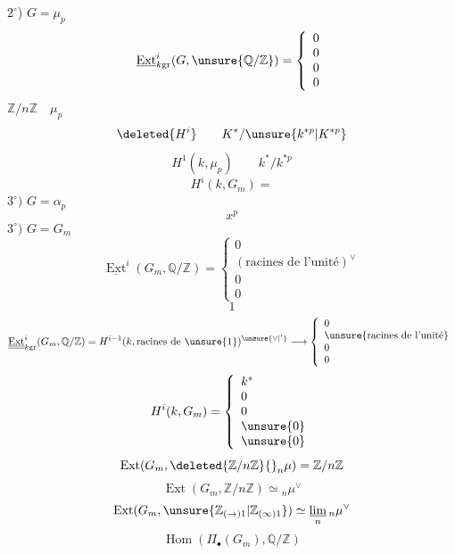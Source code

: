 \uline{$2^\circ$}) $G=\mu_p$
\[
\underline{\operatorname{Ext}}^i_{k\mathrm{gr}}(G,\unsure{\mathbb Q/\mathbb Z})=
\left\{\begin{array}{l}0\\0\\0\\0\end{array}\right.
\]
\qquad $\mathbb Z/n\mathbb Z\quad\mu_p$
\[
\deleted{H^i}\qquad K^*/\unsure{k^{*p}|K^{*p}}
\]
\[
H^1(k,\mu_p)\qquad k^*/k^{*p}
\]
\[
H^i(k,G_m)=
\]
$3^\circ)$ $G=\alpha_p$
\[
x^p
\]
$3^\circ)$ $G=G_m$
\[
\underline{\operatorname{Ext}}^i(G_m,\mathbb Q/\mathbb Z)=
\left\{\begin{array}{l}0\\(\text{racines de l'unité})^\vee\\0\\0\end{array}\right.
\]
\[
1
\]
\[
\underline{\underline{\operatorname{Ext}}}^i_{k\mathrm{gr}}(G_m,\mathbb Q/\mathbb Z)=
H^{i-1}(k,\text{racines de }\unsure{1})^{\unsure{\vee|'}}
\longrightarrow\left\{\begin{array}{l}0\\\unsure{\text{racines de l'unité}}\\0\\0\end{array}\right.
\]
\[
H^i(k,G_m)=\left\{\begin{array}{l}k^*\\0\\0\\\unsure{0}\\\unsure{0}\end{array}\right.
\]
\[
\operatorname{Ext}(G_m,\deleted{\mathbb Z/n\mathbb Z}{}_n\mu)=\mathbb Z/n\mathbb Z
\]
\[
\operatorname{Ext}(G_m,\mathbb Z/n\mathbb Z)\simeq{}_n\mu^\vee
\]
\[
\operatorname{Ext}(G_m,\unsure{\mathbb Z_{(\to)1}|\mathbb Z_{(\infty)1}})
\simeq\underset{n}{\underline{\lim}}\,{}_n\mu^\vee
\]
\[
\operatorname{Hom}(\Pi_\bullet(G_m),\mathbb Q/\mathbb Z)
\]

